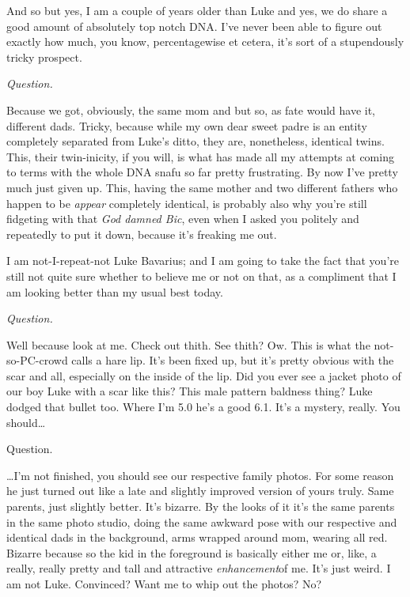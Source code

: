 And so but yes, I am a couple of years older than Luke and yes, we
do share a good amount of absolutely top notch DNA. I've
never been able to figure out exactly how much, you know,
percentagewise et cetera, it's sort of a stupendously tricky
prospect.



{\em Question.}



Because we got, obviously, the same mom and but so, as fate would
have it, different dads. Tricky, because while my own dear sweet
padre is an entity completely separated from Luke's ditto,
they are, nonetheless, identical twins. This, their twin-inicity,
if you will, is what has made all my attempts at coming to terms
with the whole DNA snafu so far pretty frustrating. By now
I've pretty much just given up. This, having the same mother
and two different fathers who happen to be {\em appear} completely
identical, is probably also why you're still fidgeting with
that {\em God damned Bic}, even when I asked you politely and
repeatedly to put it down, because it's freaking me
out.

I am not-I-repeat-not Luke Bavarius; and I am going to take the
fact that you're still not quite sure whether to believe me
or not on that, as a compliment that I am looking better than my
usual best today.



{\em Question.}



Well because look at me. Check out thith. See thith? Ow. This is
what the not-so-PC-crowd calls a hare lip. It's been fixed
up, but it's pretty obvious with the scar and all, especially
on the inside of the lip. Did you ever see a jacket photo of our
boy Luke with a scar like this? This male pattern baldness thing?
Luke dodged that bullet too. Where I'm 5.0 he's a good
6.1. It's a mystery, really. You should{\ldots}



Question.



{\ldots}I'm not finished, you should see our respective
family photos. For some reason he just turned out like a late and
slightly improved version of yours truly. Same parents, just
slightly better. It's bizarre. By the looks of it it's
the same parents in the same photo studio, doing the same awkward
pose with our respective and identical dads in the background, arms
wrapped around mom, wearing all red. Bizarre because so the kid in
the foreground is basically either me or, like, a really, really
pretty and tall and attractive {\em enhancement}of me. It's
just weird. I am not Luke. Convinced? Want me to whip out the
photos? No?



